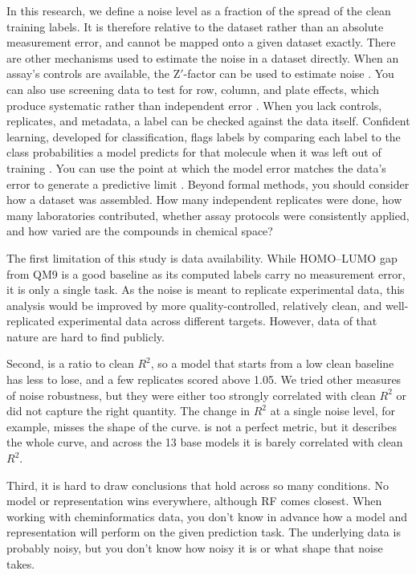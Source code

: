 In this research, we define a noise level as a fraction of the spread of the clean training labels. It is therefore relative to the dataset rather than an absolute measurement error, and cannot be mapped onto a given dataset exactly. There are other mechanisms used to estimate the noise in a dataset directly. When an assay's controls are available, the Z$'$-factor can be used to estimate noise \citep{Zhang1999}. You can also use screening data to test for row, column, and plate effects, which produce systematic rather than independent error \citep{Caraus2015}. When you lack controls, replicates, and metadata, a label can be checked against the data itself. Confident learning, developed for classification, flags labels by comparing each label to the class probabilities a model predicts for that molecule when it was left out of training \citep{Northcutt2021}. You can use the point at which the model error matches the data's error to generate a predictive limit \citep{Kolmar2021, Crusius2024}. Beyond formal methods, you should consider how a dataset was assembled. How many independent replicates were done, how many laboratories contributed, whether assay protocols were consistently applied, and how varied are the compounds in chemical space?

The first limitation of this study is data availability. While HOMO--LUMO gap from QM9 is a good baseline as its computed labels carry no measurement error, it is only a single task. As the noise is meant to replicate experimental data, this analysis would be improved by more quality-controlled, relatively clean, and well-replicated experimental data across different targets. However, data of that nature are hard to find publicly.

Second, \aucnorm{} is a ratio to clean $R^2$, so a model that starts from a low clean baseline has less to lose, and a few replicates scored above 1.05. We tried other measures of noise robustness, but they were either too strongly correlated with clean $R^2$ or did not capture the right quantity. The change in $R^2$ at a single noise level, for example, misses the shape of the curve. \aucnorm{} is not a perfect metric, but it describes the whole curve, and across the 13 base models it is barely correlated with clean $R^2$.

Third, it is hard to draw conclusions that hold across so many conditions. No model or representation wins everywhere, although RF comes closest. When working with cheminformatics data, you don't know in advance how a model and representation will perform on the given prediction task. The underlying data is probably noisy, but you don't know how noisy it is or what shape that noise takes.

